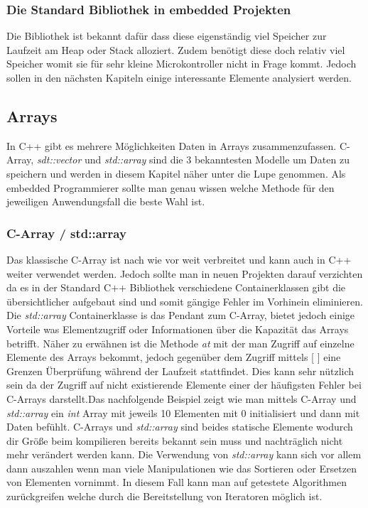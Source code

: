 \documentclass[MES,Master,ngerman]{twbook}%
\begin{document}
\subsubsection{Die Standard Bibliothek in embedded Projekten}
Die Bibliothek ist bekannt dafür dass diese eigenständig viel Speicher zur Laufzeit am Heap oder Stack alloziert. Zudem benötigt diese doch relativ viel Speicher womit sie für sehr kleine Microkontroller nicht in Frage kommt. Jedoch sollen in den nächsten Kapiteln einige interessante Elemente analysiert werden.
\newpage

\subsection{Arrays}
In C++ gibt es mehrere Möglichkeiten Daten in Arrays zusammenzufassen. C-Array, \textit{sdt::vector} und \textit{std::array} sind die 3 bekanntesten Modelle um Daten zu speichern und werden in diesem Kapitel näher unter die Lupe genommen. Als embedded Programmierer sollte man genau wissen welche Methode für den jeweiligen Anwendungsfall die beste Wahl ist.

\subsubsection{C-Array / std::array}
Das klassische C-Array ist nach wie vor weit verbreitet und kann auch in C++ weiter verwendet werden. Jedoch sollte man in neuen Projekten darauf verzichten da es in der Standard C++ Bibliothek verschiedene Containerklassen gibt die übersichtlicher aufgebaut sind und somit gängige Fehler im Vorhinein eliminieren. Die \textit{std::array} Containerklasse is das Pendant zum C-Array, bietet jedoch einige Vorteile was Elementzugriff oder Informationen über die Kapazität das Arrays betrifft. Näher zu erwähnen ist die Methode \textit{at} mit der man Zugriff auf einzelne Elemente des Arrays bekommt, jedoch gegenüber dem Zugriff mittels [ ] eine Grenzen Überprüfung während der Laufzeit stattfindet. Dies kann sehr nützlich sein da der Zugriff auf nicht existierende Elemente einer der häufigsten Fehler bei C-Arrays darstellt.\newline\newline Das nachfolgende Beispiel zeigt wie man mittels C-Array und \textit{std::array} ein \textit{int} Array mit jeweils 10 Elementen mit 0 initialisiert und dann mit Daten befühlt. C-Arrays und \textit{std::array} sind beides statische Elemente wodurch dir Größe beim kompilieren bereits bekannt sein muss und nachträglich nicht mehr verändert werden kann. Die Verwendung von \textit{std::array} kann sich vor allem dann auszahlen wenn man viele Manipulationen wie das Sortieren oder Ersetzen von Elementen vornimmt. In diesem Fall kann man auf getestete Algorithmen zurückgreifen welche durch die Bereitstellung von Iteratoren möglich ist.
\end{document}
